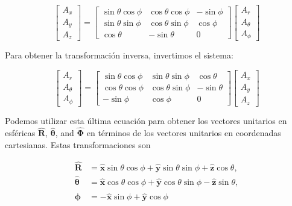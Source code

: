 \documentclass{book}
\begin{document}
\begin{equation}
\begin{bmatrix} A_x \\ A_y \\ A_z \end{bmatrix} = 
\begin{bmatrix} 
\sin \theta \cos \phi & \cos \theta \cos \phi & -\sin \phi \\
\sin \theta \sin \phi & \cos \theta \sin \phi & \cos \phi \\
\cos \theta & -\sin \theta & 0 
\end{bmatrix}
\begin{bmatrix} A_r \\ A_{\theta} \\ A_{\phi} \end{bmatrix}
\end{equation}

Para obtener la transformación inversa, invertimos el sistema:

\begin{equation}
\begin{bmatrix} A_r \\ A_{\theta} \\ A_{\phi} \end{bmatrix} = 
\begin{bmatrix} 
\sin \theta \cos \phi & \sin \theta \sin \phi & \cos \theta \\
\cos \theta \cos \phi & \cos \theta \sin \phi & -\sin \theta \\
-\sin \phi & \cos \phi & 0 
\end{bmatrix}
\begin{bmatrix} A_x \\ A_y \\ A_z \end{bmatrix}
\end{equation}

Podemos utilizar esta última ecuación para obtener los vectores unitarios en esféricas $\mathbf{\hat{R}}$, $\mathbf{\hat{\theta}}$, and $\mathbf{\hat{\Phi}}$ en términos de los vectores unitarios en coordenadas cartesianas. Estas transformaciones son

\begin{align}
\mathbf{\hat{R}} &= \mathbf{\hat{x}} \sin \theta \cos \phi + \mathbf{\hat{y}} \sin \theta \sin \phi + \mathbf{\hat{z}} \cos \theta, \\
\mathbf{\hat{\theta}} &= \mathbf{\hat{x}} \cos \theta \cos \phi + \mathbf{\hat{y}} \cos \theta \sin \phi - \mathbf{\hat{z}} \sin \theta, \\
\mathbf{\hat{\phi}} &= -\mathbf{\hat{x}} \sin \phi + \mathbf{\hat{y}} \cos \phi
\end{align}
\end{document}

